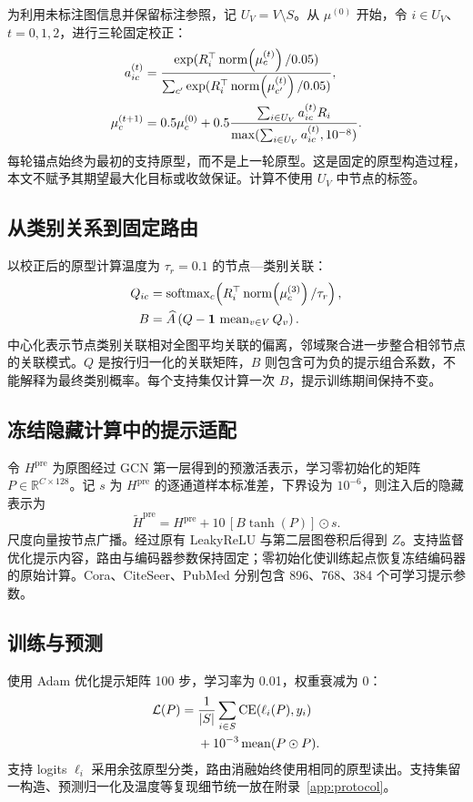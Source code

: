 为利用未标注图信息并保留标注参照，记 $U_V=V\setminus S$。从 $\mu^{(0)}$ 开始，令 $i\in U_V$、$t=0,1,2$，进行三轮固定校正：
\begin{align}
a_{ic}^{(t)}&=\frac{\exp(R_i^\top\operatorname{norm}\!\left(\mu_c^{(t)}\right)/0.05)}{\sum_{c'}\exp(R_i^\top\operatorname{norm}\!\left(\mu_{c'}^{(t)}\right)/0.05)},\label{eq:assignment}\\
\mu_c^{(t+1)}&=0.5\mu_c^{(0)}+0.5\frac{\sum_{i\in U_V}a_{ic}^{(t)}R_i}{\max(\sum_{i\in U_V}a_{ic}^{(t)},10^{-8})}.\label{eq:refinement}
\end{align}
每轮锚点始终为最初的支持原型，而不是上一轮原型。这是固定的原型构造过程，本文不赋予其期望最大化目标或收敛保证。计算不使用 $U_V$ 中节点的标签。

\subsection{从类别关系到固定路由}
以校正后的原型计算温度为 $\tau_r=0.1$ 的节点—类别关联：
\begin{equation}
\begin{aligned}
Q_{ic}&=\operatorname{softmax}_c\!\left(R_i^\top\operatorname{norm}\!\left(\mu_c^{(3)}\right)/\tau_r\right),\\
B&=\widehat A\left(Q-\mathbf1\,\operatorname{mean}_{v\in V}Q_v\right).
\end{aligned}
\label{eq:routing}
\end{equation}
中心化表示节点类别关联相对全图平均关联的偏离，邻域聚合进一步整合相邻节点的关联模式。$Q$ 是按行归一化的关联矩阵，$B$ 则包含可为负的提示组合系数，不能解释为最终类别概率。每个支持集仅计算一次 $B$，提示训练期间保持不变。

\subsection{冻结隐藏计算中的提示适配}
令 $H^{\mathrm{pre}}$ 为原图经过 GCN 第一层得到的预激活表示，学习零初始化的矩阵 $P\in\mathbb R^{C\times128}$。记 $s$ 为 $H^{\mathrm{pre}}$ 的逐通道样本标准差，下界设为 $10^{-6}$，则注入后的隐藏表示为
\begin{equation}
\widetilde H^{\mathrm{pre}}=H^{\mathrm{pre}}+10\,[B\tanh(P)]\odot s.
\label{eq:injection}
\end{equation}
尺度向量按节点广播。经过原有 LeakyReLU 与第二层图卷积后得到 $Z$。支持监督优化提示内容，路由与编码器参数保持固定；零初始化使训练起点恢复冻结编码器的原始计算。Cora、CiteSeer、PubMed 分别包含 896、768、384 个可学习提示参数。

\subsection{训练与预测}
使用 Adam 优化提示矩阵 100 步，学习率为 0.01，权重衰减为 0：
\begin{equation}
\begin{aligned}
\mathcal L(P)={}&\frac{1}{|S|}\sum_{i\in S}\operatorname{CE}(\ell_i(P),y_i)\\
&+10^{-3}\operatorname{mean}(P\odot P).
\end{aligned}
\label{eq:loss}
\end{equation}
支持 logits $\ell_i$ 采用余弦原型分类，路由消融始终使用相同的原型读出。支持集留一构造、预测归一化及温度等复现细节统一放在附录~\ref{app:protocol}。

